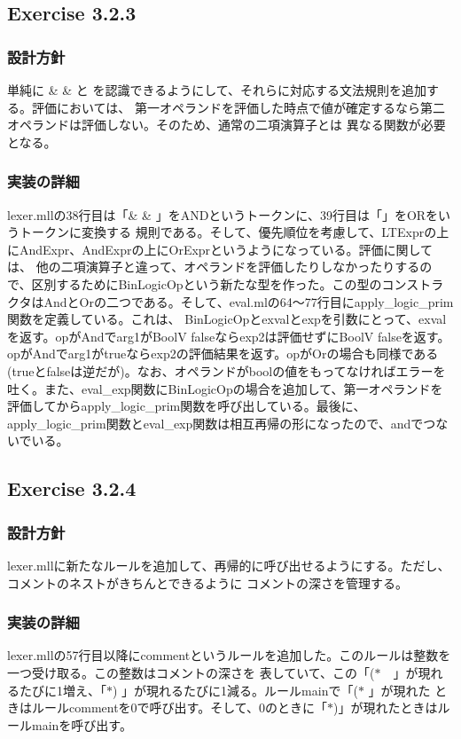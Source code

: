 \documentclass{jarticle}
\begin{document}
\subsection{Exercise 3.2.3}
\subsubsection{設計方針}
単純に \& \& と \textbar \textbar を認識できるようにして、それらに対応する文法規則を追加する。評価においては、
第一オペランドを評価した時点で値が確定するなら第二オペランドは評価しない。そのため、通常の二項演算子とは
異なる関数が必要となる。

\subsubsection{実装の詳細}
lexer.mllの38行目は「\& \& 」をANDというトークンに、39行目は「\textbar \textbar」をORをいうトークンに変換する
規則である。そして、優先順位を考慮して、LTExprの上にAndExpr、AndExprの上にOrExprというようになっている。評価に関しては、
他の二項演算子と違って、オペランドを評価したりしなかったりするので、区別するためにBinLogicOpという新たな型を作った。この型のコンストラクタはAndとOrの二つである。そして、eval.mlの64〜77行目にapply\_logic\_prim関数を定義している。これは、
BinLogicOpとexvalとexpを引数にとって、exvalを返す。opがAndでarg1がBoolV falseならexp2は評価せずにBoolV falseを返す。
opがAndでarg1がtrueならexp2の評価結果を返す。opがOrの場合も同様である(trueとfalseは逆だが)。なお、オペランドがboolの値をもってなければエラーを吐く。また、eval\_exp関数にBinLogicOpの場合を追加して、第一オペランドを評価してからapply\_logic\_prim関数を呼び出している。最後に、apply\_logic\_prim関数とeval\_exp関数は相互再帰の形になったので、andでつないでいる。

\subsection{Exercise 3.2.4}
\subsubsection{設計方針}
lexer.mllに新たなルールを追加して、再帰的に呼び出せるようにする。ただし、コメントのネストがきちんとできるように
コメントの深さを管理する。

\subsubsection{実装の詳細}
lexer.mllの57行目以降にcommentというルールを追加した。このルールは整数を一つ受け取る。この整数はコメントの深さを
表していて、この「($\ast$　」が現れるたびに1増え、「$\ast$) 」が現れるたびに1減る。ルールmainで「($\ast$ 」が現れた
ときはルールcommentを0で呼び出す。そして、0のときに「$\ast$)」が現れたときはルールmainを呼び出す。
\end{document}
